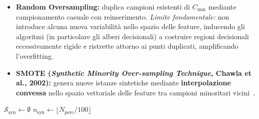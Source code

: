 \begin{itemize}
    \item \textbf{Random Oversampling:} duplica campioni esistenti di $C_{\text{min}}$ mediante campionamento casuale con reinserimento.
    \textit{Limite fondamentale:} non introduce alcuna nuova variabilità nello spazio delle feature, inducendo gli algoritmi (in particolare gli alberi decisionali) a costruire regioni decisionali eccessivamente rigide e ristrette attorno ai punti duplicati, amplificando l'overfitting.
    \item \textbf{SMOTE (\textit{Synthetic Minority Over-sampling Technique}, Chawla et al., 2002):} genera nuove istanze sintetiche mediante \textbf{interpolazione convessa} nello spazio vettoriale delle feature tra campioni minoritari vicini~\cite{chawla2002}.
\end{itemize}

\begin{algorithm}[H]
\caption{Algoritmo SMOTE per la Generazione Sintetica della Classe Minoritaria}
\label{alg:dm-smote}
\SetAlgoLined
{}
$\mathcal{S}_{\text{syn}} \leftarrow \emptyset$\;
$n_{\text{syn}} \leftarrow \lfloor N_{\text{perc}} / 100 \rfloor$\;
\;
\end{algorithm}

